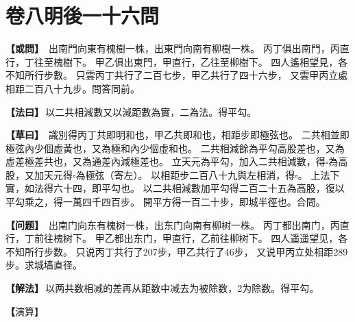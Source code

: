 \documentclass[11pt,a4paper]{article}
\let\origsquare\square
\renewcommand{\square}{\ensuremath{\origsquare}}%
\newcommand{\clOWEN}[1]{%
  \par\vspace{0.3em}%
  \noindent\textcolor{problemcolor}{\textbf{【或問】}}\,{\tradfont #1}\par\nopagebreak%
}
\newcommand{\mdOWEN}[1]{%
  \par\vspace{0.3em}%
  \noindent\textcolor{problemcolor}{\textbf{【问题】}}\,{\modfont #1}\par\nopagebreak%
}
\newcommand{\clFAYUE}[1]{%
  \par\noindent\textcolor{methodcolor}{\textbf{【法曰】}}\,{\tradfont #1}\par\nopagebreak%
}
\newcommand{\mdFAYUE}[1]{%
  \par\noindent\textcolor{methodcolor}{\textbf{【解法】}}\,{\modfont #1}\par\nopagebreak%
}
\newcommand{\clTSAOYUE}[1]{%
  \par\noindent\textcolor{workcolor}{\textbf{【草曰】}}\,{\tradfont #1}\par%
}
\newcommand{\mdTSAOYUE}[1]{%
  \par\noindent\textcolor{workcolor}{\textbf【演算】}}\,{\modfont #1}\par%
\begin{document}
\newpage


\section{\tradfont 卷八\quad 明後一十六問}
\label{sec:vol8}

\begin{center}
\end{center}

\vspace{0.5cm}

\begin{paracol}{2}

\begin{leftcolumn}
\clOWEN{%
出南門向東有槐樹一株，出東門向南有柳樹一株。
丙丁俱出南門，丙直行，丁往至槐樹下。
甲乙俱出東門，甲直行，乙往至柳樹下。
四人遙相望見，各不知所行步數。
只雲丙丁共行了二百七步，甲乙共行了四十六步，
又雲甲丙立處相距二百八十九步。問答同前。}

\clFAYUE{以二共相減數又以減距數為實，二為法。得平勾。}

\clTSAOYUE{%
識別得丙丁共即明和也，甲乙共即和也，相距步即極弦也。
二共相並即極弦內少個虛黃也，又為極和內少個虛和也。
二共相減餘為平勾高股差也，又為虛差極差共也，又為通差內減極差也。
立天元為平勾，加入二共相減數，得$\square$為高股，又加天元得$\square$為極弦（寄左）。
以相距步二百八十九與左相消，得$\square$。
上法下實，如法得六十四，即平勾也。
以二共相減數加平勾得二百二十五為高股，復以平勾乘之，得一萬四千四百步。
開平方得一百二十步，即城半徑也。合問。}
\end{leftcolumn}

\switchcolumn

\begin{rightcolumn}
\mdOWEN{%
出南门向东有槐树一株，出东门向南有柳树一株。
丙丁都出南门，丙直行，丁前往槐树下。
甲乙都出东门，甲直行，乙前往柳树下。
四人遥遥望见，各不知所行步数。
只说丙丁共行了207步，甲乙共行了46步，
又说甲丙立处相距289步。求城墙直径。}

\mdFAYUE{以两共数相减的差再从距数中减去为被除数，2为除数。得平勾。}

\mdTSAOYUE{%
辨识得：丙丁共即明和，甲乙共即和，相距步即极弦。
两共数相加即极弦内少一个虚黄，又为极和内少一个虚和。
两共数相减余为平勾与高股之差，又为虚差与极差之和，又为通差减去极差。
设天元为平勾，加入两共相减数，得$\square$为高股，再加天元得$\square$为极弦（寄左）。
以相距步289与左式相消，得$\square$。
上法下实，依法得64，即平勾。
以两共相减数加平勾得225为高股，再以平勾乘之，得14,400步。
开平方得120步，即城半半径。符合所问。}
\end{rightcolumn}

\end{paracol}
\end{document}
